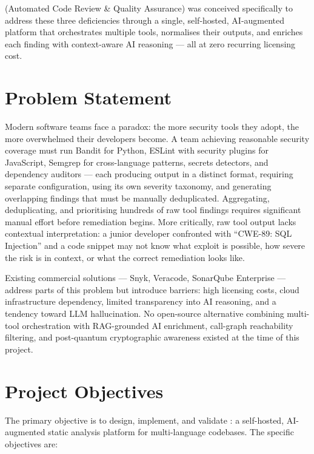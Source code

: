 \ACRQA{} (Automated Code Review \& Quality Assurance) was conceived specifically to address these three deficiencies through a single, self-hosted, AI-augmented platform that orchestrates multiple tools, normalises their outputs, and enriches each finding with context-aware AI reasoning --- all at zero recurring licensing cost.

\section{Problem Statement}
\label{sec:problem}

Modern software teams face a paradox: the more security tools they adopt, the more overwhelmed their developers become. A team achieving reasonable security coverage must run Bandit \cite{bandit_tool} for Python, ESLint with security plugins \cite{eslint_security} for JavaScript, Semgrep \cite{semgrep_tool} for cross-language patterns, secrets detectors, and dependency auditors \cite{cve_program} --- each producing output in a distinct format, requiring separate configuration, using its own severity taxonomy, and generating overlapping findings that must be manually deduplicated. Aggregating, deduplicating, and prioritising hundreds of raw tool findings requires significant manual effort before remediation begins. More critically, raw tool output lacks contextual interpretation: a junior developer confronted with ``CWE-89: SQL Injection'' and a code snippet may not know what exploit is possible, how severe the risk is in context, or what the correct remediation looks like.

Existing commercial solutions --- Snyk, Veracode, SonarQube Enterprise --- address parts of this problem but introduce barriers: high licensing costs, cloud infrastructure dependency, limited transparency into AI reasoning, and a tendency toward LLM hallucination. No open-source alternative combining multi-tool orchestration with RAG-grounded AI enrichment, call-graph reachability filtering, and post-quantum cryptographic awareness existed at the time of this project.

\section{Project Objectives}
\label{sec:objectives}

The primary objective is to design, implement, and validate \ACRQA{}: a self-hosted, AI-augmented static analysis platform for multi-language codebases. The specific objectives are:

